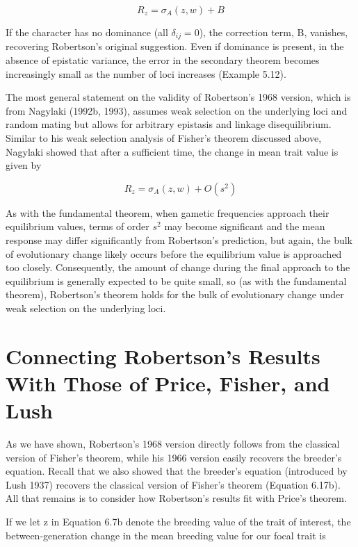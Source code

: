 \documentclass{article}
\begin{document}
\begin{equation}
R_{z}=\sigma_{A}(z,w)+B
\tag{6.26}
\label{eq:6_26}
\end{equation}

If the character has no dominance (all  $ \delta_{ij}=0 $), the correction term, B, vanishes, recovering Robertson's original suggestion. Even if dominance is present, in the absence of epistatic variance, the error in the secondary theorem becomes increasingly small as the number of loci increases (Example 5.12).

The most general statement on the validity of Robertson’s 1968 version, which is from Nagylaki (1992b, 1993), assumes weak selection on the underlying loci and random mating but allows for arbitrary epistasis and linkage disequilibrium. Similar to his weak selection analysis of Fisher’s theorem discussed above, Nagylaki showed that after a sufficient time, the change in mean trait value is given by

\begin{equation}
R_{z}=\sigma_{A}(z,w)+O(s^{2})
\tag{6.27}
\label{eq:6_27}
\end{equation}

As with the fundamental theorem, when gametic frequencies approach their equilibrium values, terms of order  $ s^{2} $ may become significant and the mean response may differ significantly from Robertson's prediction, but again, the bulk of evolutionary change likely occurs before the equilibrium value is approached too closely. Consequently, the amount of change during the final approach to the equilibrium is generally expected to be quite small, so (as with the fundamental theorem), Robertson's theorem holds for the bulk of evolutionary change under weak selection on the underlying loci.

\section{Connecting Robertson’s Results With Those of Price, Fisher, and Lush}
As we have shown, Robertson’s 1968 version directly follows from the classical version of Fisher’s theorem, while his 1966 version easily recovers the breeder’s equation. Recall that we also showed that the breeder’s equation (introduced by Lush 1937) recovers the classical version of Fisher’s theorem (Equation 6.17b). All that remains is to consider how Robertson’s results fit with Price’s theorem.

If we let z in Equation 6.7b denote the breeding value of the trait of interest, the between-generation change in the mean breeding value for our focal trait is
\end{document}
